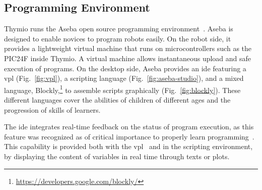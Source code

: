 \documentclass[letterpaper, 10 pt, conference]{ieeeconf}  %
\begin{document}
\subsection{Programming Environment}
\label{sec:aseba}

Thymio runs the Aseba open source programming environment~\cite{aseba}.
Aseba is designed to enable novices to program robots easily.
On the robot side, it provides a lightweight virtual machine that runs on microcontrollers such as the PIC24F inside Thymio.
A virtual machine allows instantaneous upload and safe execution of programs.
On the desktop side, Aseba provides an \ac{ide} featuring a \ac{vpl} (Fig.~\ref{fig:vpl}), a scripting language (Fig.~\ref{fig:aseba-studio}), and a mixed language, Blockly,\footnote{\url{https://developers.google.com/blockly/}} to assemble scripts graphically (Fig.~\ref{fig:blockly}).
These different languages cover the abilities of children of different ages and the progression of skills of learners.


The \ac{ide} integrates real-time feedback on the status of program execution, as this feature was recognized as of critical importance to properly learn programming~\cite{sorva2013notional}.
This capability is provided both with the \ac{vpl}~\cite{Magnenat2015} and in the scripting environment, by displaying the content of variables in real time through texts or plots.
\end{document}
